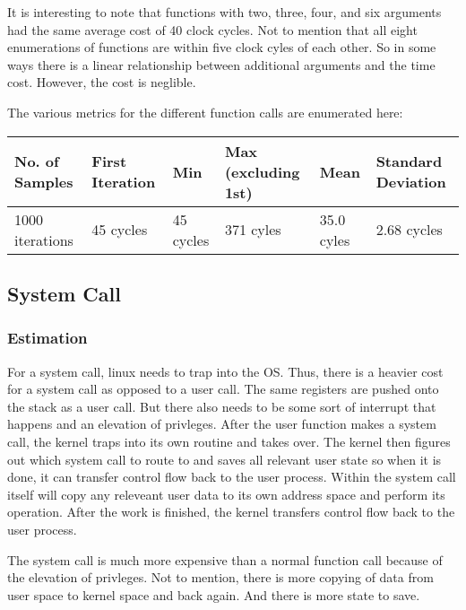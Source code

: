 \documentclass[paper=a4, fontsize=11pt]{scrartcl}
\numberwithin{equation}{section}        %
\numberwithin{figure}{section}          %
\numberwithin{table}{section}               %
\begin{document}
It is interesting to note that functions with two, three, four, and six arguments had the same average cost of 40 clock cycles.  Not to mention that all eight enumerations of functions are within five clock cyles of each other.  So in some ways there is a linear relationship between additional arguments and the time cost.  However, the cost is neglible.

The various metrics for the different function calls are enumerated here:

\begin{center}
    \begin{tabular}{ | l | l | l | l | l | l |}
    \hline
    No. of Samples & First Iteration & Min & Max (excluding 1st) & Mean & Standard Deviation \\ \hline
    1000 iterations & 45 cycles & 45 cycles & 371 cyles & 35.0 cyles & 2.68 cycles \\ 
    \hline
    \end{tabular}
\end{center}

\subsection{System Call}

\subsubsection{Estimation}

For a system call, linux needs to trap into the OS. Thus, there is a heavier cost for a system call as opposed to a user call.  The same registers are pushed onto the stack as a user call.  But there also needs to be some sort of interrupt that happens and an elevation of privleges.  After the user function makes a system call,  the kernel traps into its own routine and takes over.  The kernel then figures out which system call to route to and saves all relevant user state so when it is done, it can transfer control flow back to the user process.  Within the system call itself will copy any releveant user data to its own address space and perform its operation.  After the work is finished, the kernel transfers control flow back to the user process.

The system call is much more expensive than a normal function call because of the elevation of privleges.  Not to mention, there is more copying of data from user space to kernel space and back again.  And there is more state to save.
\end{document}
